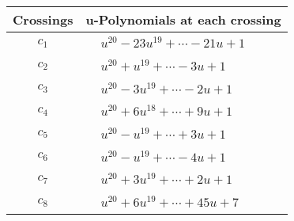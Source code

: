 \documentclass[1p]{elsarticle_modified}
\theoremstyle{definition}
\begin{document}
\begin{tabular}{m{50pt}|m{274pt}}
Crossings & \hspace{64pt}u-Polynomials at each crossing \\
\hline $$\begin{aligned}c_{1}\end{aligned}$$&$\begin{aligned}
&u^{20}-23 u^{19}+\cdots-21 u+1
\end{aligned}$\\
\hline $$\begin{aligned}c_{2}\end{aligned}$$&$\begin{aligned}
&u^{20}+u^{19}+\cdots-3 u+1
\end{aligned}$\\
\hline $$\begin{aligned}c_{3}\end{aligned}$$&$\begin{aligned}
&u^{20}-3 u^{19}+\cdots-2 u+1
\end{aligned}$\\
\hline $$\begin{aligned}c_{4}\end{aligned}$$&$\begin{aligned}
&u^{20}+6 u^{18}+\cdots+9 u+1
\end{aligned}$\\
\hline $$\begin{aligned}c_{5}\end{aligned}$$&$\begin{aligned}
&u^{20}- u^{19}+\cdots+3 u+1
\end{aligned}$\\
\hline $$\begin{aligned}c_{6}\end{aligned}$$&$\begin{aligned}
&u^{20}- u^{19}+\cdots-4 u+1
\end{aligned}$\\
\hline $$\begin{aligned}c_{7}\end{aligned}$$&$\begin{aligned}
&u^{20}+3 u^{19}+\cdots+2 u+1
\end{aligned}$\\
\hline $$\begin{aligned}c_{8}\end{aligned}$$&$\begin{aligned}
&u^{20}+6 u^{19}+\cdots+45 u+7
\end{aligned}$\\

\end{tabular}
\end{document}
